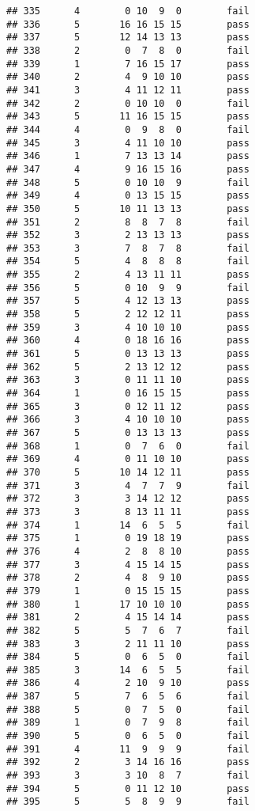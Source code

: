 \documentclass[
]{article}
\begin{document}
\begin{verbatim}
## 335      4        0 10  9  0        fail
## 336      5       16 16 15 15        pass
## 337      5       12 14 13 13        pass
## 338      2        0  7  8  0        fail
## 339      1        7 16 15 17        pass
## 340      2        4  9 10 10        pass
## 341      3        4 11 12 11        pass
## 342      2        0 10 10  0        fail
## 343      5       11 16 15 15        pass
## 344      4        0  9  8  0        fail
## 345      3        4 11 10 10        pass
## 346      1        7 13 13 14        pass
## 347      4        9 16 15 16        pass
## 348      5        0 10 10  9        fail
## 349      4        0 13 15 15        pass
## 350      5       10 11 13 13        pass
## 351      2        8  8  7  8        fail
## 352      3        2 13 13 13        pass
## 353      3        7  8  7  8        fail
## 354      5        4  8  8  8        fail
## 355      2        4 13 11 11        pass
## 356      5        0 10  9  9        fail
## 357      5        4 12 13 13        pass
## 358      5        2 12 12 11        pass
## 359      3        4 10 10 10        pass
## 360      4        0 18 16 16        pass
## 361      5        0 13 13 13        pass
## 362      5        2 13 12 12        pass
## 363      3        0 11 11 10        pass
## 364      1        0 16 15 15        pass
## 365      3        0 12 11 12        pass
## 366      3        4 10 10 10        pass
## 367      5        0 13 13 13        pass
## 368      1        0  7  6  0        fail
## 369      4        0 11 10 10        pass
## 370      5       10 14 12 11        pass
## 371      3        4  7  7  9        fail
## 372      3        3 14 12 12        pass
## 373      3        8 13 11 11        pass
## 374      1       14  6  5  5        fail
## 375      1        0 19 18 19        pass
## 376      4        2  8  8 10        pass
## 377      3        4 15 14 15        pass
## 378      2        4  8  9 10        pass
## 379      1        0 15 15 15        pass
## 380      1       17 10 10 10        pass
## 381      2        4 15 14 14        pass
## 382      5        5  7  6  7        fail
## 383      3        2 11 11 10        pass
## 384      5        0  6  5  0        fail
## 385      3       14  6  5  5        fail
## 386      4        2 10  9 10        pass
## 387      5        7  6  5  6        fail
## 388      5        0  7  5  0        fail
## 389      1        0  7  9  8        fail
## 390      5        0  6  5  0        fail
## 391      4       11  9  9  9        fail
## 392      2        3 14 16 16        pass
## 393      3        3 10  8  7        fail
## 394      5        0 11 12 10        pass
## 395      5        5  8  9  9        fail
\end{verbatim}
\end{document}
